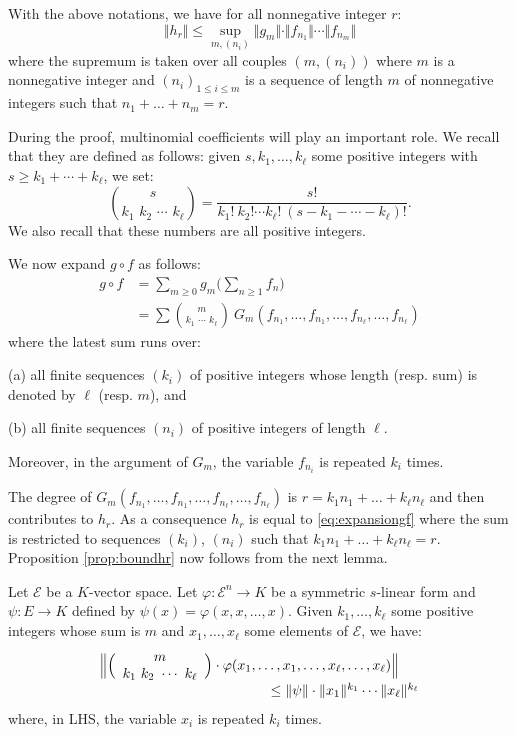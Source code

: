 \documentclass{sig-alternate}
\begin{document}
\begin{prop}
\label{prop:boundhr}
With the above notations, we have for all nonnegative integer $r$:
$$\Vert h_r \Vert \leq \sup_{m, (n_i)}
  \Vert g_m \Vert \cdot \Vert f_{n_1} \Vert \cdots \Vert f_{n_m} \Vert$$
where the supremum is taken over all couples $(m, (n_i))$ where $m$
is a nonnegative integer and $(n_i)_{1 \leq i \leq m}$ is a sequence of
length $m$ of nonnegative integers such that $n_1 + \ldots + n_m = r$.
\end{prop}

During the proof, multinomial coefficients will play an important role. 
We recall that they are defined as follows: 
given $s, k_1, \ldots, k_\ell$ some positive integers with $s \geq
k_1 + \cdots + k_\ell$, we set:
$$\binom s {k_1 \,\, k_2 \,\, \cdots \,\, k_\ell} =
  \frac{s!}{k_1!\: k_2! \cdots k_\ell! \: (s{-}k_1{-}\cdots{-}k_\ell)!}.$$
We also recall that these numbers are all positive integers.

We now expand $g \circ f$ as follows:
\begin{align}
g \circ f & = \sum_{m \geq 0} g_m \Big(\sum_{n \geq 1} f_n\Big) \nonumber \\
& = \sum \binom m {\!k_1 \,\, \cdots \,\, k_\ell\!} \:
G_m(f_{n_1}, \ldots, f_{n_1}, \ldots, f_{n_\ell}, \ldots, f_{n_\ell})
\label{eq:expansiongf}
\end{align}
where the latest sum runs over:

\noindent
(a) all finite sequences $(k_i)$ of positive integers whose length 
(resp. sum) is denoted by $\ell$ (resp. $m$), and

\noindent
(b) all finite sequences $(n_i)$ of positive integers of length
$\ell$.

\noindent
Moreover, in the argument of $G_m$, the variable $f_{n_i}$ 
is repeated $k_i$ times.

The degree of $G_m(f_{n_1}, \ldots, f_{n_1}, \ldots, f_{n_\ell},
\ldots, f_{n_\ell})$ is $r = k_1 n_1 + \ldots + k_\ell n_\ell$ and 
then contributes to $h_r$. As a consequence $h_r$ is equal to 
\eqref{eq:expansiongf} where the sum is restricted to sequences
$(k_i)$, $(n_i)$ such that $k_1 n_1 + \ldots + k_\ell n_\ell = r$.
Proposition \ref{prop:boundhr} now follows from the next lemma.

\begin{lem}
Let $\mathcal E$ be a $K$-vector space. Let $\varphi : \mathcal E^n \to 
K$ be a symmetric $s$-linear form and $\psi: E \to K$ defined by 
$\psi(x) = \varphi(x, x, \ldots, x)$.
Given $k_1, \ldots, k_\ell$ some positive integers whose sum is $m$ and 
$x_1, \ldots, x_\ell$ some elements of $\mathcal E$, we have:
$$\begin{array}{l}
\Big\Vert \binom m {k_1 \,\, k_2 \,\, \cdots \,\, k_\ell} \cdot
\varphi(x_1, \ldots, x_1, \ldots, x_\ell, \ldots,
x_\ell) \Big\Vert  \\
\hspace{4.3cm} \leq \Vert \psi \Vert \cdot \Vert x_1 \Vert^{k_1} \cdots
 \Vert x_\ell \Vert^{k_\ell}
\end{array}$$
where, in LHS, the variable $x_i$ is repeated $k_i$ times.
\end{lem}
\end{document}
